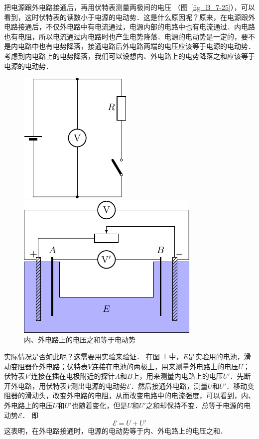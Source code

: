 把电源跟外电路接通后，再用伏特表测量两极间的电压
（图~\ref{fig_B_7-25}），可以看到，这时伏特表的读数小于电源的电动势．这是什么原因呢？原来，在电源跟外电路接通后，不仅外电路中有电流通过，电源内部的电路中也有电流通过．内电路也有电阻，所以电流通过内电路时也产生电势降落．电源的电动势是一定的，要不是内电路中也有电势降落，接通电路后外电路两端的电压应该等于电源的电动势．考虑到内电路上的电势降落，我们可以设想内、外电路上的电势降落之和应该等于电源的电动势．
\begin{figure}[htbp]
    \centering
    \begin{minipage}[t]{0.4\textwidth}
        \centering
        \includegraphics{fig/B/7-25.pdf}
        \caption{}\label{fig_B_7-25}
    \end{minipage}
    \hfil
    \begin{minipage}[t]{0.53\textwidth}
        \centering
        \includegraphics{fig/B/7-26.pdf}
        \caption{内、外电路上的电压之和等于电动势}\label{fig_B_7-26}
    \end{minipage}
\end{figure}

实际情况是否如此呢？这需要用实验来验证．
在图~\ref{fig_B_7-26} 中，$E$是实验用的电池，滑动变阻器作外电路；伏特表$V$连接在电池的两极上，用来测量外电路上的电压$U$；伏特表$V'$连接在插在电极附近的探针$A$和$B$上，用来测量内电路上的电压$U'$．先断开外电路，用伏特表$V$测出电源的电动势$\mathcal{E}$．然后接通外电路，测量$U$和$U'$．移动变阻器的滑动头，改变外电路的电阻，从而改变电路中的电流强度，可以看到，内、外电路上的电压$U$和$U'$也随着变化，但是$U$和$U'$之和却保持不变．总等于电源的电动势$\mathcal{E}$．
即
\[\mathcal{E}=U+U'\]
这表明，在外电路接通时，电源的电动势等于内、外电路上的电压之和．

